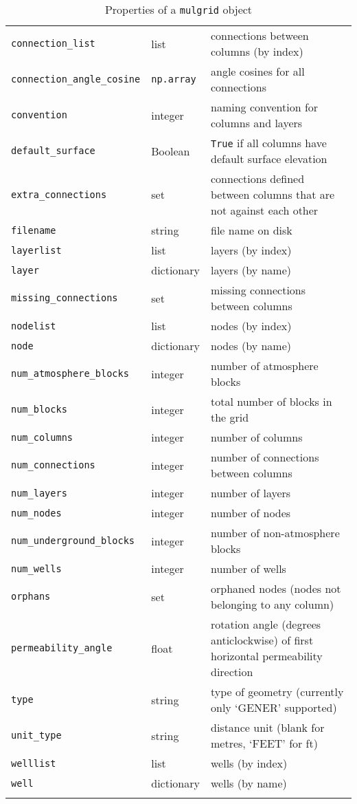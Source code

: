 \begin{center}
\begin{longtable}{|l|l|p{75mm}|}
    \texttt{connection\_list} & list & connections between columns (by index)\\
    \texttt{connection\_angle\_cosine} & \texttt{np.array} & angle cosines for all connections\\
    \texttt{convention} & integer & naming convention for columns and layers\\
    \texttt{default\_surface} & Boolean  & \texttt{True} if all columns have default surface elevation\\
    \texttt{extra\_connections} & set & connections defined between columns that are not against each other\\
    \texttt{filename} & string  & file name on disk\\
    \texttt{layerlist} & list & layers (by index)\\
    \texttt{layer} & dictionary & layers (by name)\\
    \texttt{missing\_connections} & set & missing connections between columns\\
    \texttt{nodelist} & list  & nodes (by index)\\
    \texttt{node} & dictionary  & nodes (by name)\\
    \texttt{num\_atmosphere\_blocks} & integer & number of atmosphere blocks\\
    \texttt{num\_blocks} & integer & total number of blocks in the grid\\
    \texttt{num\_columns} & integer & number of columns\\
    \texttt{num\_connections} & integer & number of connections between columns\\
    \texttt{num\_layers} & integer & number of layers\\
    \texttt{num\_nodes} & integer & number of nodes\\
    \texttt{num\_underground\_blocks} & integer & number of non-atmosphere blocks\\
    \texttt{num\_wells} & integer & number of wells\\
    \texttt{orphans} & set & orphaned nodes (nodes not belonging to any column)\\
    \texttt{permeability\_angle} & float & rotation angle (degrees anticlockwise) of first horizontal permeability direction \\
    \texttt{type} & string  & type of geometry (currently only `GENER' supported)\\
    \texttt{unit\_type} & string & distance unit (blank for metres, `FEET' for ft)\\
    \texttt{welllist} & list & wells (by index)\\
    \texttt{well} & dictionary & wells (by name)\\
    \hline
    \caption{Properties of a \texttt{mulgrid} object}
    \label{tb:mulgrid_properties}
  \end{longtable}
\end{center}


